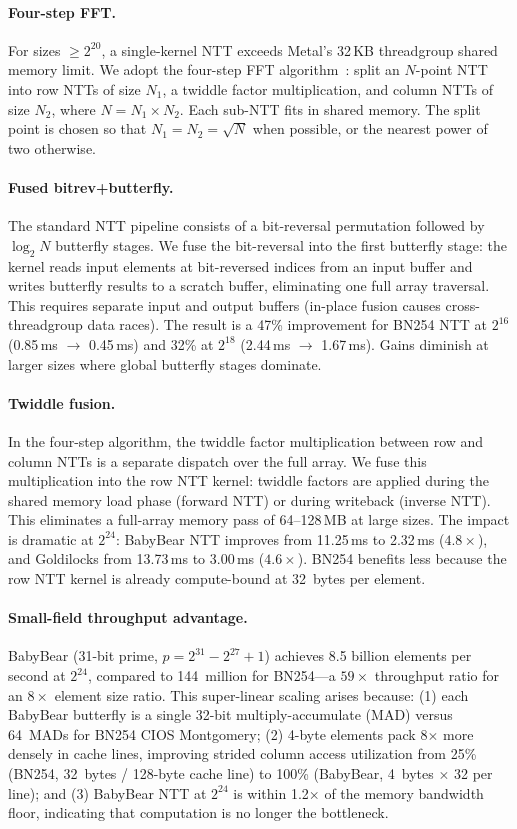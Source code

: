 \paragraph{Four-step FFT.}
For sizes $\geq 2^{20}$, a single-kernel NTT exceeds Metal's 32\,KB
threadgroup shared memory limit. We adopt the four-step FFT
algorithm~\cite{bailey-ffts}: split an $N$-point NTT into row NTTs of size
$N_1$, a twiddle factor multiplication, and column NTTs of size $N_2$, where
$N = N_1 \times N_2$. Each sub-NTT fits in shared memory. The split point is
chosen so that $N_1 = N_2 = \sqrt{N}$ when possible, or the nearest power of
two otherwise.

\paragraph{Fused bitrev+butterfly.}
The standard NTT pipeline consists of a bit-reversal permutation followed by
$\log_2 N$ butterfly stages. We fuse the bit-reversal into the first butterfly
stage: the kernel reads input elements at bit-reversed indices from an input
buffer and writes butterfly results to a scratch buffer, eliminating one full
array traversal. This requires separate input and output buffers (in-place
fusion causes cross-threadgroup data races). The result is a 47\% improvement
for BN254 NTT at $2^{16}$ (0.85\,ms $\to$ 0.45\,ms) and 32\% at $2^{18}$
(2.44\,ms $\to$ 1.67\,ms). Gains diminish at larger sizes where global
butterfly stages dominate.

\paragraph{Twiddle fusion.}
In the four-step algorithm, the twiddle factor multiplication between row and
column NTTs is a separate dispatch over the full array. We fuse this
multiplication into the row NTT kernel: twiddle factors are applied during the
shared memory load phase (forward NTT) or during writeback (inverse NTT). This
eliminates a full-array memory pass of 64--128\,MB at large sizes. The impact is
dramatic at $2^{24}$: BabyBear NTT improves from 11.25\,ms to 2.32\,ms
($4.8\times$), and Goldilocks from 13.73\,ms to 3.00\,ms ($4.6\times$). BN254
benefits less because the row NTT kernel is already compute-bound at 32~bytes
per element.

\paragraph{Small-field throughput advantage.}
BabyBear (31-bit prime, $p = 2^{31} - 2^{27} + 1$) achieves 8.5 billion
elements per second at $2^{24}$, compared to 144~million for BN254---a
$59\times$ throughput ratio for an $8\times$ element size ratio. This
super-linear scaling arises because: (1) each BabyBear butterfly is a single
32-bit multiply-accumulate (MAD) versus 64~MADs for BN254 CIOS Montgomery; (2)
4-byte elements pack 8$\times$ more densely in cache lines, improving strided
column access utilization from 25\% (BN254, 32~bytes / 128-byte cache line) to
100\% (BabyBear, 4~bytes $\times$ 32 per line); and (3) BabyBear NTT at $2^{24}$
is within 1.2$\times$ of the memory bandwidth floor, indicating that computation
is no longer the bottleneck.


